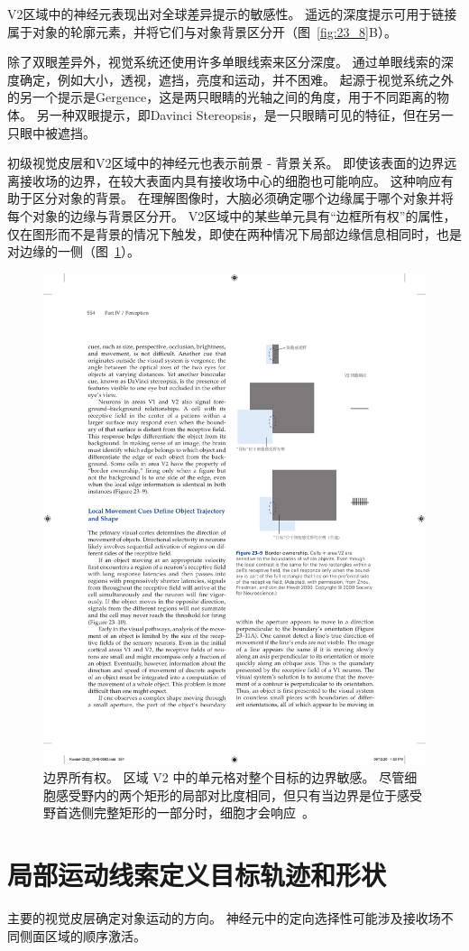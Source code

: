 V2区域中的神经元表现出对全球差异提示的敏感性。 
遥远的深度提示可用于链接属于对象的轮廓元素，并将它们与对象背景区分开（图~\ref{fig:23_8}B）。


除了双眼差异外，视觉系统还使用许多单眼线索来区分深度。
通过单眼线索的深度确定，例如大小，透视，遮挡，亮度和运动，并不困难。
起源于视觉系统之外的另一个提示是Gergence，这是两只眼睛的光轴之间的角度，用于不同距离的物体。
另一种双眼提示，即Davinci Stereopsis，是一只眼睛可见的特征，但在另一只眼中被遮挡。


初级视觉皮层和V2区域中的神经元也表示前景 - 背景关系。
即使该表面的边界远离接收场的边界，在较大表面内具有接收场中心的细胞也可能响应。
这种响应有助于区分对象的背景。
在理解图像时，大脑必须确定哪个边缘属于哪个对象并将每个对象的边缘与背景区分开。 
V2区域中的某些单元具有“边框所有权”的属性，仅在图形而不是背景的情况下触发，即使在两种情况下局部边缘信息相同时，也是对边缘的一侧（图~\ref{fig:23_9}）。


\begin{figure}[htbp]
	\centering
	\includegraphics[width=0.5\linewidth]{chap23/fig_23_9}
	\caption{边界所有权。
		区域 V2 中的单元格对整个目标的边界敏感。
		尽管细胞感受野内的两个矩形的局部对比度相同，但只有当边界是位于感受野首选侧完整矩形的一部分时，细胞才会响应~\cite{zhou2000coding}。}
	\label{fig:23_9}
\end{figure}



\section{局部运动线索定义目标轨迹和形状}

主要的视觉皮层确定对象运动的方向。
神经元中的定向选择性可能涉及接收场不同侧面区域的顺序激活。


